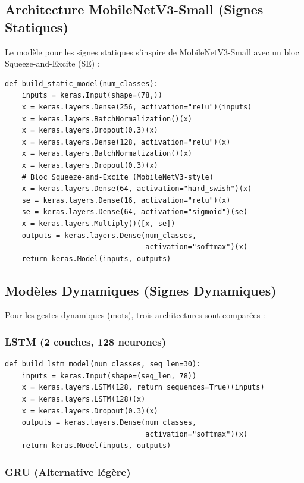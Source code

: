 \subsection{Architecture MobileNetV3-Small (Signes Statiques)}

Le modèle pour les signes statiques s'inspire de MobileNetV3-Small avec un bloc Squeeze-and-Excite (SE) :

\begin{lstlisting}[style=python, caption={Architecture MobileNetV3-Small adaptée}]
def build_static_model(num_classes):
    inputs = keras.Input(shape=(78,))
    x = keras.layers.Dense(256, activation="relu")(inputs)
    x = keras.layers.BatchNormalization()(x)
    x = keras.layers.Dropout(0.3)(x)
    x = keras.layers.Dense(128, activation="relu")(x)
    x = keras.layers.BatchNormalization()(x)
    x = keras.layers.Dropout(0.3)(x)
    # Bloc Squeeze-and-Excite (MobileNetV3-style)
    x = keras.layers.Dense(64, activation="hard_swish")(x)
    se = keras.layers.Dense(16, activation="relu")(x)
    se = keras.layers.Dense(64, activation="sigmoid")(se)
    x = keras.layers.Multiply()([x, se])
    outputs = keras.layers.Dense(num_classes,
                                 activation="softmax")(x)
    return keras.Model(inputs, outputs)
\end{lstlisting}

\subsection{Modèles Dynamiques (Signes Dynamiques)}

Pour les gestes dynamiques (mots), trois architectures sont comparées :

\subsubsection{LSTM (2 couches, 128 neurones)}

\begin{lstlisting}[style=python, caption={Architecture LSTM}]
def build_lstm_model(num_classes, seq_len=30):
    inputs = keras.Input(shape=(seq_len, 78))
    x = keras.layers.LSTM(128, return_sequences=True)(inputs)
    x = keras.layers.LSTM(128)(x)
    x = keras.layers.Dropout(0.3)(x)
    outputs = keras.layers.Dense(num_classes,
                                 activation="softmax")(x)
    return keras.Model(inputs, outputs)
\end{lstlisting}

\subsubsection{GRU (Alternative légère)}

